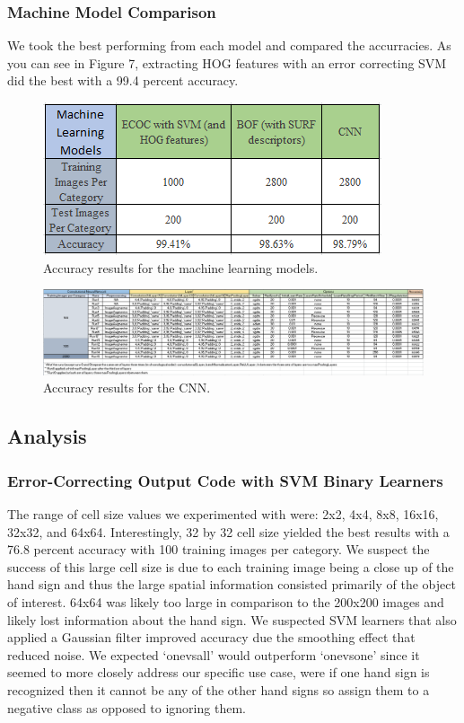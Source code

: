 \documentclass[conference]{IEEEtran}
\begin{document}
\subsubsection{Machine Model Comparison}
We took the best performing from each model and compared the accurracies. As you can see in Figure 7, extracting HOG features with an error correcting SVM did the best with a 99.4 percent accuracy.
\begin{figure}[h]
\centering
\includegraphics[width=\linewidth]{Overview}
\caption{Accuracy results for the machine learning models.}
\end{figure}
\begin{figure}[h]
\centering
\includegraphics[width=\linewidth]{CNN}
\caption{Accuracy results for the CNN.}
\end{figure}
\subsection{Analysis}
\subsubsection{Error-Correcting Output Code with SVM Binary Learners}
The range of cell size values we experimented with were: 2x2, 4x4, 8x8, 16x16, 32x32, and 64x64. Interestingly, 32 by 32 cell size yielded the best results with a 76.8 percent accuracy with 100 training images per category. We suspect the success of this large cell size is due to each training image being a close up of the hand sign and thus the large spatial information consisted primarily of the object of interest. 64x64 was likely too large in comparison to the 200x200 images and likely lost information about the hand sign. We suspected SVM learners that also applied a Gaussian filter improved accuracy due the smoothing effect that reduced noise. We expected ‘onevsall’ would outperform ‘onevsone’ since it seemed to more closely address our specific use case, were if one hand sign is recognized then it cannot be any of the other hand signs so assign them to a negative class as opposed to ignoring them. 
\end{document}
